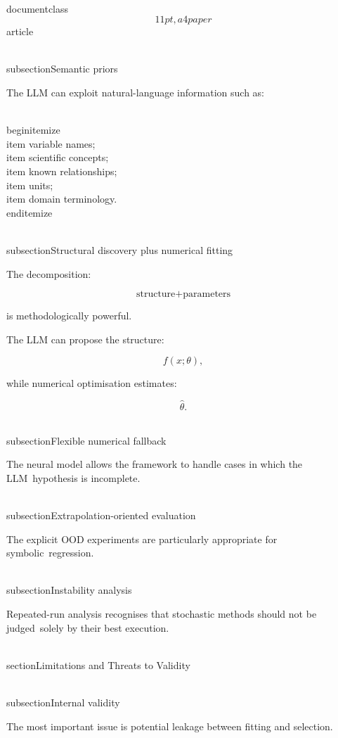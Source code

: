\\documentclass\[11pt,a4paper\]{article}
\begin{document}
 \\subsection{Semantic priors}

 The LLM can exploit natural-language information such as:

 \\begin{itemize}\
 \\item variable names;\
 \\item scientific concepts;\
 \\item known relationships;\
 \\item units;\
 \\item domain terminology.\
 \\end{itemize}

 \\subsection{Structural discovery plus numerical fitting}

 The decomposition:

 $$
\text{structure}
+
\text{parameters}
$$

 is methodologically powerful.

 The LLM can propose the structure:

 $$
f(x;\theta),
$$

 while numerical optimisation estimates:

 $$
\hat{\theta}.
$$

 \\subsection{Flexible numerical fallback}

 The neural model allows the framework to handle cases in which the LLM\
 hypothesis is incomplete.

 \\subsection{Extrapolation-oriented evaluation}

 The explicit OOD experiments are particularly appropriate for symbolic\
 regression.

 \\subsection{Instability analysis}

 Repeated-run analysis recognises that stochastic methods should not be judged\
 solely by their best execution.

 \\section{Limitations and Threats to Validity}\

 \\subsection{Internal validity}

 The most important issue is potential leakage between fitting and selection.
\end{document}
